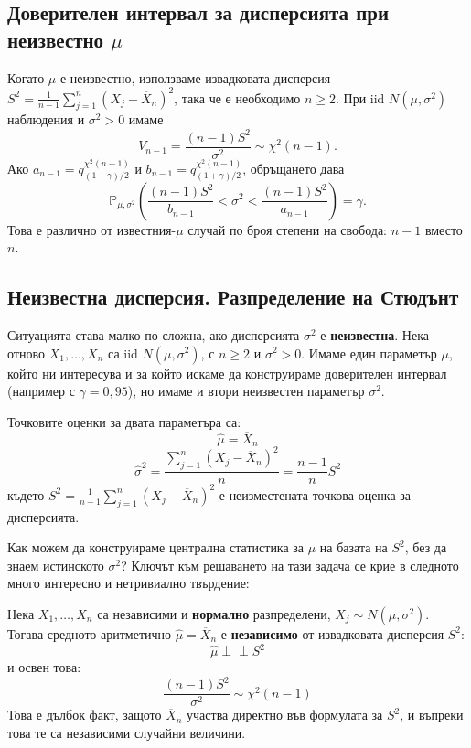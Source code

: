 \subsection{Доверителен интервал за дисперсията при неизвестно $\mu$}

Когато $\mu$ е неизвестно, използваме извадковата дисперсия
$S^2=\frac{1}{n-1}\sum_{j=1}^n(X_j-\overline X_n)^2$, така че е необходимо $n\ge2$.
При iid $N(\mu,\sigma^2)$ наблюдения и $\sigma^2>0$ имаме
\[
V_{n-1}=\frac{(n-1)S^2}{\sigma^2}\sim\chi^2(n-1).
\]
Ако $a_{n-1}=q_{(1-\gamma)/2}^{\chi^2(n-1)}$ и
$b_{n-1}=q_{(1+\gamma)/2}^{\chi^2(n-1)}$, обръщането дава
\[
\mathbb{P}_{\mu,\sigma^2}\!\left(
\frac{(n-1)S^2}{b_{n-1}}<\sigma^2<\frac{(n-1)S^2}{a_{n-1}}
\right)=\gamma.
\]
Това е различно от известния-$\mu$ случай по броя степени на свобода: $n-1$ вместо $n$.

\subsection{Неизвестна дисперсия. Разпределение на Стюдънт}
Ситуацията става малко по-сложна, ако дисперсията $\sigma^2$ е \textbf{неизвестна}. Нека
отново $X_1,\dots,X_n$ са iid $N(\mu,\sigma^2)$, с $n\ge2$ и $\sigma^2>0$.
Имаме един параметър $\mu$, който ни интересува и за който искаме да конструираме доверителен интервал (например с $\gamma = 0{,}95$), но имаме и втори неизвестен параметър $\sigma^2$.

Точковите оценки за двата параметъра са:
\[
\hat{\mu} = \overline{X}_n
\]
\[
\hat{\sigma}^2 = \frac{\sum_{j=1}^n (X_j - \overline{X}_n)^2}{n} = \frac{n-1}{n} S^2
\]
където $S^2 = \frac{1}{n-1} \sum_{j=1}^n (X_j - \overline{X}_n)^2$ е неизместената точкова оценка за дисперсията.

Как можем да конструираме централна статистика за $\mu$ на базата на $S^2$, без да знаем истинското $\sigma^2$? Ключът към решаването на тази задача се крие в следното много интересно и нетривиално твърдение:
\begin{prop}
Нека $X_1, \dots, X_n$ са независими и \textbf{нормално} разпределени, $X_j \sim N(\mu, \sigma^2)$.
Тогава средното аритметично $\hat{\mu} = \overline{X}_n$ е \textbf{независимо} от извадковата дисперсия $S^2$:
\[
\hat{\mu} \perp\!\!\!\perp S^2
\]
и освен това:
\[
\frac{(n-1)S^2}{\sigma^2} \sim \chi^2(n-1)
\]
Това е дълбок факт, защото $\overline{X}_n$ участва директно във формулата за $S^2$, и въпреки това те са независими случайни величини.
\end{prop}

